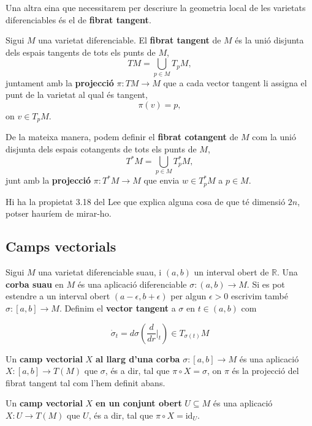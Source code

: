 Una altra eina que necessitarem per descriure la geometria local de les varietats diferenciables és el de \textbf{fibrat tangent}.
\begin{defi}
    Sigui $M$ una varietat diferenciable. El \textbf{fibrat tangent} de $M$ és la unió disjunta dels espais tangents de tots els punts de $M$, 
    \begin{equation*}
        TM = \bigcup_{p\in M} T_pM,
    \end{equation*}
    juntament amb la \textbf{projecció} $\pi:TM\to M$ que a cada vector tangent li assigna el punt de la varietat al qual és tangent,
    \begin{equation*}
        \pi(v) = p,
    \end{equation*}
    on $v\in T_pM$.
\end{defi}
De la mateixa manera, podem definir el \textbf{fibrat cotangent} de $M$ com la unió disjunta dels espais cotangents de tots els punts de $M$,
\begin{equation*}
    T^*M = \bigcup_{p\in M} T^*_pM,
\end{equation*}
junt amb la \textbf{projecció} $\pi:T^*M\to M$ que envia $w\in T^*_pM$ a $p\in M$.


{\color{blue} Hi ha la propietat 3.18 del Lee que explica alguna cosa de que té dimensió $2n$, potser hauríem de mirar-ho.}

\subsection{Camps vectorials}
\begin{defi}
    Sigui $M$ una varietat diferenciable suau, i $(a,b)$ un interval obert de $\mathbb R$. Una \textbf{corba suau} en $M$ és una aplicació diferenciable $\sigma:(a,b)\to M$. Si es pot estendre a un interval obert $(a-\epsilon,b+\epsilon)$ per algun $\epsilon>0$ escrivim també $\sigma:[a,b]\to M$. Definim el \textbf{vector tangent} a $\sigma$ en $t\in(a,b)$ com

    \begin{equation*}
        \dot{\sigma}_t = d\sigma\left(\frac{d}{dr}\Big|_{t}\right)\in T_{\sigma(t)}M
    \end{equation*}
\end{defi}

\begin{defi}
    Un \textbf{camp vectorial} $X$ \textbf{al llarg d'una corba} $\sigma:[a,b]\to M$ és una aplicació $X:[a,b]\to T(M)$ que  $\sigma$, és a dir, tal que $\pi\circ X = \sigma$, on $\pi$ és la projecció del fibrat tangent tal com l'hem definit abans. 

    Un \textbf{camp vectorial} $X$ \textbf{en un conjunt obert} $U\subseteq M$ és una aplicació $X:U\to T(M)$ que  $U$, és a dir, tal que $\pi\circ X = \text{id}_U$.
\end{defi}


